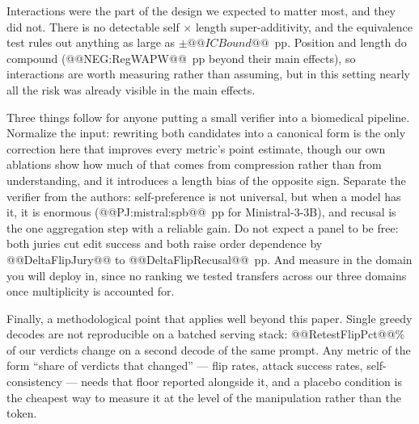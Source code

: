 \documentclass[conference]{IEEEtran}
\begin{document}
Interactions were the part of the design we expected to matter most, and they did not. There is no detectable self $\times$ length super-additivity, and the equivalence test rules out anything as large as $\pm@@ICBound@@$~pp. Position and length do compound (@@NEG:RegWAPW@@~pp beyond their main effects), so interactions are worth measuring rather than assuming, but in this setting nearly all the risk was already visible in the main effects.

Three things follow for anyone putting a small verifier into a biomedical pipeline. Normalize the input: rewriting both candidates into a canonical form is the only correction here that improves every metric's point estimate, though our own ablations show how much of that comes from compression rather than from understanding, and it introduces a length bias of the opposite sign. Separate the verifier from the authors: self-preference is not universal, but when a model has it, it is enormous (@@PJ:mistral:spb@@~pp for Ministral-3-3B), and recusal is the one aggregation step with a reliable gain. Do not expect a panel to be free: both juries cut edit success and both raise order dependence by @@DeltaFlipJury@@ to @@DeltaFlipRecusal@@~pp. And measure in the domain you will deploy in, since no ranking we tested transfers across our three domains once multiplicity is accounted for.

Finally, a methodological point that applies well beyond this paper. Single greedy decodes are not reproducible on a batched serving stack: @@RetestFlipPct@@\% of our verdicts change on a second decode of the same prompt. Any metric of the form ``share of verdicts that changed'' --- flip rates, attack success rates, self-consistency --- needs that floor reported alongside it, and a placebo condition is the cheapest way to measure it at the level of the manipulation rather than the token.
\end{document}
